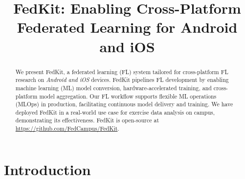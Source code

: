 \documentclass[conference]{IEEEtran}
\begin{document}
\newcommand*\circled[1]{\tikz[baseline=(char.base)]{
        \node[shape=circle,draw,inner sep=.6pt] (char) {#1};}}

\title{FedKit: Enabling Cross-Platform Federated Learning for Android and iOS\\
}

\author{
}

\maketitle

\begin{abstract}
    We present FedKit, a federated learning (FL) system tailored for
    cross-platform FL research on \textit{Android and iOS} devices.
    FedKit pipelines FL development by
    enabling machine learning (ML) model conversion,
    hardware-accelerated training,
    and cross-platform model aggregation.
    Our FL workflow supports flexible ML operations (MLOps) in production,
    facilitating continuous model delivery and training.
    We have deployed FedKit in a real-world use case for
    exercise data analysis on campus,
    demonstrating its effectiveness.
    FedKit is open-source at \url{https://github.com/FedCampus/FedKit}.
\end{abstract}


\section{Introduction}
\end{document}
